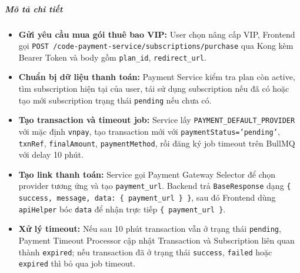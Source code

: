 \subparagraph{Mô tả chi tiết}
\begin{itemize}
\item \textbf{Gửi yêu cầu mua gói thuê bao VIP:} User chọn nâng cấp VIP, Frontend gọi \texttt{POST /code-payment-service/subscriptions/purchase} qua Kong kèm Bearer Token và body gồm \texttt{plan\_id}, \texttt{redirect\_url}.
\item \textbf{Chuẩn bị dữ liệu thanh toán:} Payment Service kiểm tra plan còn active, tìm subscription hiện tại của user, tái sử dụng subscription nếu đã có hoặc tạo mới subscription trạng thái \texttt{pending} nếu chưa có.
\item \textbf{Tạo transaction và timeout job:} Service lấy \texttt{PAYMENT\_DEFAULT\_PROVIDER} với mặc định \texttt{vnpay}, tạo transaction mới với \texttt{paymentStatus='pending'}, \texttt{txnRef}, \texttt{finalAmount}, \texttt{paymentMethod}, rồi đăng ký job timeout trên BullMQ với delay 10 phút.
\item \textbf{Tạo link thanh toán:} Service gọi Payment Gateway Selector để chọn provider tương ứng và tạo \texttt{payment\_url}. Backend trả \texttt{BaseResponse} dạng \texttt{\{ success, message, data: \{ payment\_url \} \}}, sau đó Frontend dùng \texttt{apiHelper} bóc \texttt{data} để nhận trực tiếp \texttt{\{ payment\_url \}}.
\item \textbf{Xử lý timeout:} Nếu sau 10 phút transaction vẫn ở trạng thái \texttt{pending}, Payment Timeout Processor cập nhật Transaction và Subscription liên quan thành \texttt{expired}; nếu transaction đã ở trạng thái \texttt{success}, \texttt{failed} hoặc \texttt{expired} thì bỏ qua job timeout.
\end{itemize}
